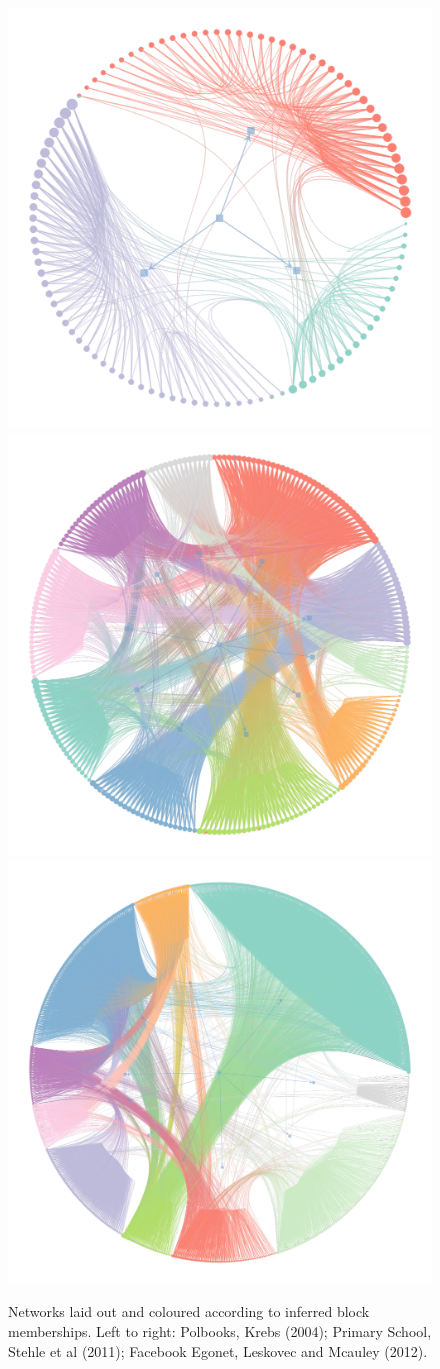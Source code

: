 \begin{table}[!ht]
	\centering
	\caption{Results averaged over $n=10$ iterations (mean $\pm$ std. dev.).}
	\label{tab:results}
\end{table}

\begin{figure}[!ht]
	\centering
	\includegraphics[width=0.28\linewidth]{fig/trayfig3a}
	\includegraphics[width=0.28\linewidth]{fig/trayfig3b}
	\includegraphics[width=0.28\linewidth]{fig/trayfig3c}
	\caption{Networks laid out and coloured according to inferred block memberships. Left to right: Polbooks, Krebs (2004); Primary School, Stehle et al (2011); Facebook Egonet, Leskovec and Mcauley (2012).}
	\label{fig:graphs-all}
\end{figure}